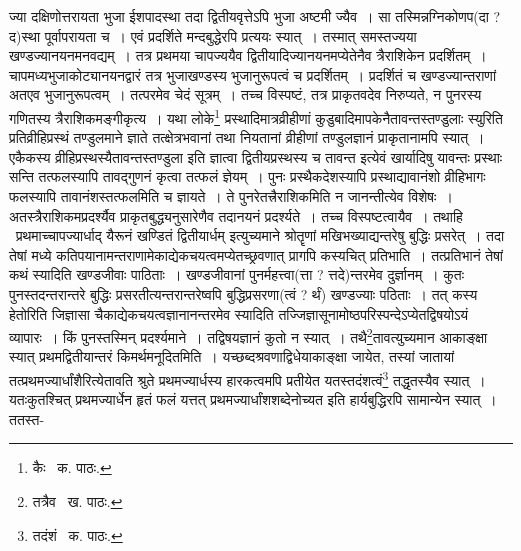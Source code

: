 \documentclass[11pt, openany]{book}
\begin{document}
\noindent ज्या दक्षिणोत्तरायता भुजा ईशपादस्था तदा द्वितीयवृत्तेऽपि भुजा अष्टमी ज्यैव~। सा तस्मिन्नग्निकोणप(दा ? द)स्था पूर्वापरायता च~। एवं प्रदर्शिते मन्दबुद्धेरपि प्रत्ययः स्यात्~। तस्मात् समस्तज्यया खण्डज्यानयनमनवद्यम्~। तत्र प्रथमया चापज्ययैव द्वितीयादिज्यानयनमप्येतेनैव त्रैराशिकेन प्रदर्शितम्~। चापमध्यभुजाकोट्यानयनद्वारं तत्र भुजाखण्डस्य भुजानुरूपत्वं च प्रदर्शितम्~। प्रदर्शितं च खण्डज्यान्तराणां अतएव भुजानुरूपत्वम्~। तत्परमेव चेदं सूत्रम्~। तच्च विस्पष्टं, तत्र प्राकृतवदेव निरुप्यते, न पुनरस्य गणितस्य त्रैराशिकमङ्गीकृत्य~। यथा लोके\renewcommand{\thefootnote}{१}\footnote{कैः \textendash\ क. पाठः.}
प्रस्थादिमात्रव्रीहीणां कुडुबादिमापकेनैतावन्तस्तण्डुलाः स्युरिति प्रतिव्रीहिप्रस्थं तण्डुलमाने ज्ञाते तत्क्षेत्रभवानां तथा नियतानां व्रीहीणां तण्डुलज्ञानं प्राकृतानामपि स्यात्~। एकैकस्य व्रीहिप्रस्थस्यैतावन्तस्तण्डुला इति ज्ञात्वा द्वितीयप्रस्थस्य च तावन्त इत्येवं खार्यादिषु यावन्तः प्रस्थाः सन्ति तत्फलस्यापि तावद्गुणनं कृत्वा तत्फलं ज्ञेयम्~। पुनः प्रस्थैकदेशस्यापि प्रस्थाद्यावानंशो व्रीहिभागः फलस्यापि
तावानंशस्तत्फलमिति च ज्ञायते~। ते पुनरेतत्त्रैराशिकमिति न जानन्तीत्येव विशेषः~। अतस्त्रैराशिकमप्रदर्श्यैव प्राकृतबुद्ध्यनुसारेणैव तदानयनं
प्रदर्श्यते~। तच्च विस्पष्टत्वायैव~। तथाहि \textendash\ {\qt प्रथमाच्चापज्यार्धाद् यैरूनं खण्डितं द्वितीयार्धम्} इत्युच्यमाने श्रोतॄणां मखिभख्याद्यन्तरेषु बुद्धिः प्रसरेत्~। तदा तेषां मध्ये कतिपयानामन्तराणामेकाद्येकचयत्वमप्येतच्छ्रवणात् प्रागपि कस्यचित् प्रतिभाति~। तत्प्रतिभानं तेषां कथं स्यादिति खण्डजीवाः पाठिताः~। खण्डजीवानां पुनर्महत्त्वा(त्ता ? त्तदे)न्तरमेव दुर्ज्ञानम्~। कुतः पुनस्तदन्तरान्तरे बुद्धिः प्रसरतीत्यन्तरान्तरेष्वपि बुद्धिप्रसरणा(त्वं ? र्थं) खण्डज्याः पठिताः~। तत् कस्य हेतोरिति जिज्ञासा चैकाद्येकचयत्वज्ञानानन्तरमेव स्यादिति तज्जिज्ञासूनामोष्ठपरिस्पन्देऽप्येतद्विषयोऽयं व्यापारः~। किं पुनस्तस्मिन् प्रदर्श्यमाने~। तद्विषयज्ञानं कुतो न स्यात्~। तथै\renewcommand{\thefootnote}{२}\footnote{तत्रैव \textendash\ ख. पाठः.}तावत्युच्यमान आकाङ्क्षा स्यात् प्रथमद्वितीयान्तरं किमर्थमनूदितमिति~। यच्छब्दश्रवणाद्विधेयाकाङ्क्षा जायेत, तस्यां जातायां तत्प्रथमज्यार्धांशैरित्येतावति श्रुते प्रथमज्यार्धस्य हारकत्वमपि प्रतीयेत यतस्तदंशत्वं\renewcommand{\thefootnote}{३}\footnote{तदंशं \textendash\ क. पाठः.} तद्धृतस्यैव स्यात्~। यतःकुतश्चित् प्रथमज्यार्धेन हृतं फलं यत्तत् प्रथमज्यार्धांशशब्देनोच्यत इति हार्यबुद्धिरपि सामान्येन स्यात्~। ततस्त-

\newpage
\end{document}
